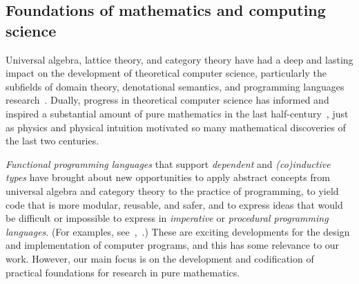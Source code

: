 \documentclass[11pt]{amsart}  %
\begin{document}
\subsection{Foundations of mathematics and computing science}
Universal algebra, lattice theory, and category theory have had a deep and lasting impact on the development of theoretical computer science,  particularly the subfields of domain theory, denotational semantics, and programming languages research~\cite{MR1249550}. Dually, progress in theoretical computer science has informed and inspired a substantial amount of pure mathematics in the last half-century~\cite{MR3662915,MR3725758,MR2765040,MR3233442,MR1321662, MR1249550}, %
just as physics and physical intuition motivated so many mathematical discoveries of the last two centuries.


\emph{Functional programming languages} that support \emph{dependent} and \emph{(co)inductive types} have brought about new opportunities to apply abstract concepts from universal algebra and category theory to the practice of programming, to yield code that is more modular, reusable, and safer, and to express ideas that would be difficult or impossible to express in \emph{imperative} or \emph{procedural programming languages}. (For examples, see~\cite{baueroplss:2018},~\cite[Chs. 5 \& 10]{chiusano:2014}.) These are exciting developments for the design and implementation of computer programs, and this has some relevance to our work.  However, our main focus is on the development and codification of practical foundations for research in pure mathematics.
 
\end{document}
